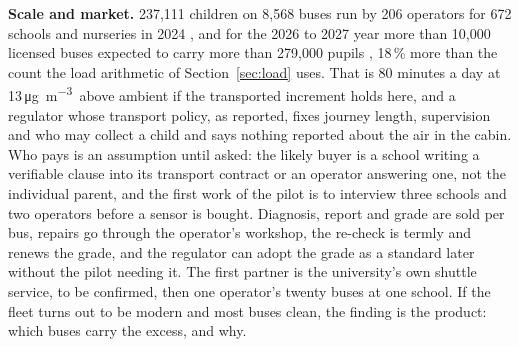 \documentclass[10pt,a4paper]{article}
\newcommand{\ugm}{\si{\micro\gram\per\cubic\metre}}
\begin{document}
\textbf{Scale and market.} 237,111 children on 8,568 buses run by 206 operators for 672 schools and nurseries in 2024 \citep{ADM2024buses}, and for the 2026 to 2027 year more than 10,000 licensed buses expected to carry more than 279,000 pupils \citep{GN2026buses}, 18\,\% more than the count the load arithmetic of Section~\ref{sec:load} uses. That is 80 minutes a day at 13\,\ugm\ above ambient if the transported increment holds here, and a regulator whose transport policy, as reported, fixes journey length, supervision and who may collect a child \citep{KT2025adek} and says nothing reported about the air in the cabin. Who pays is an assumption until asked: the likely buyer is a school writing a verifiable clause into its transport contract or an operator answering one, not the individual parent, and the first work of the pilot is to interview three schools and two operators before a sensor is bought. Diagnosis, report and grade are sold per bus, repairs go through the operator's workshop, the re-check is termly and renews the grade, and the regulator can adopt the grade as a standard later without the pilot needing it. The first partner is the university's own shuttle service, to be confirmed, then one operator's twenty buses at one school. If the fleet turns out to be modern and most buses clean, the finding is the product: which buses carry the excess, and why.
\end{document}
